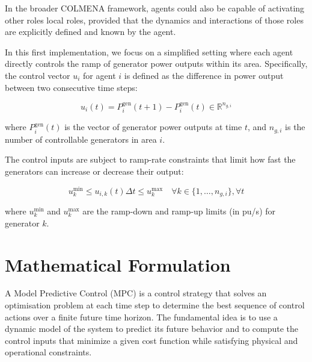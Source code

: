 \documentclass{article}
\begin{document}
In the broader COLMENA framework, agents could also be capable of activating other roles local roles, provided that the dynamics and interactions of those roles are explicitly defined and known by the agent.

In this first implementation, we focus on a simplified setting where each agent directly controls the ramp of generator power outputs within its area. Specifically, the control vector \( u_i \) for agent \( i \) is defined as the difference in power output between two consecutive time steps:

\begin{equation}
    u_i(t) = P^{\text{gen}}_i(t+1) - P^{\text{gen}}_i(t) \in \mathbb{R}^{n_{g,i}}
\end{equation}

where \( P^{\text{gen}}_i(t) \) is the vector of generator power outputs at time \( t \), and \( n_{g,i} \) is the number of controllable generators in area \( i \).

The control inputs are subject to ramp-rate constraints that limit how fast the generators can increase or decrease their output:

\begin{equation}
    u^{\min}_{k} \leq u_{i,k}(t)  \Delta  t \leq u^{\max}_{k} \quad \forall k \in \{1, \dots, n_{g,i}\}, \forall t
\end{equation}

where \( u^{\min}_{k} \) and \( u^{\max}_{k} \) are the ramp-down and ramp-up limits (in pu/s) for generator \( k \). 

\section{Mathematical Formulation}

A Model Predictive Control (MPC) is a control strategy that solves an optimisation problem at each time step to determine the best sequence of control actions over a finite future time horizon. The fundamental idea is to use a dynamic model of the system to predict its future behavior and to compute the control inputs that minimize a given cost function while satisfying physical and operational constraints.

\end{document}
